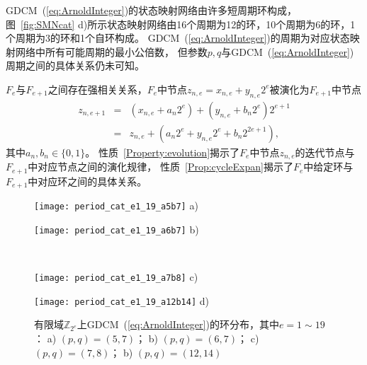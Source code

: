 GDCM~(\ref{eq:ArnoldInteger})的状态映射网络由许多短周期环构成，
图~\ref{fig:SMNcat} d)所示状态映射网络由16个周期为12的环，10个周期为6的环，1个周期为3的环和1个自环构成。
GDCM~(\ref{eq:ArnoldInteger})的周期为对应状态映射网络中所有可能周期的最小公倍数，
但参数$p,q$与GDCM~(\ref{eq:ArnoldInteger})周期之间的具体关系仍未可知。

$F_e$与$F_{e+1}$之间存在强相关关系，$F_e$中节点$z_{n, e}=x_{n, e}+y_{n, e}2^e$被演化为$F_{e+1}$中节点
\begin{eqnarray}
	z_{n, e+1} & = & (x_{n, e}+a_{n}2^e) + (y_{n, e}+b_{n}2^e) 2^{e+1} \nonumber\\
	           & = & z_{n, e}+(a_{n}2^e+y_{n, e}2^e+b_{n}2^{2e+1} ),
\label{eq:evoluteNumber}	
\end{eqnarray}
其中$a_{n}, b_{n}\in \{0, 1\}$。
性质~\ref{Property:evolution}揭示了$F_e$中节点$z_{n, e}$的迭代节点与$F_{e+1}$中对应节点之间的演化规律，
性质~\ref{Prop:cycleExpan}揭示了$F_e$中给定环与$F_{e+1}$中对应环之间的具体关系。

\begin{figure*}[!htb]
\centering
\begin{minipage}{0.95\BigOneImW}
\centering
\texttt{[image: period\_cat\_e1\_19\_a5b7]}
a)
\end{minipage} \hspace{1mm}
\begin{minipage}{0.95\BigOneImW}
\centering
\texttt{[image: period\_cat\_e1\_19\_a6b7]}
b)
\end{minipage}\\
\begin{minipage}{0.95\BigOneImW}
\centering
\texttt{[image: period\_cat\_e1\_19\_a7b8]}
c)
\end{minipage} \hspace{1mm}
\begin{minipage}{0.95\BigOneImW}
\centering
\texttt{[image: period\_cat\_e1\_19\_a12b14]}
d)
\end{minipage}
\caption{有限域$\mathbb{Z}_{2^e}$上GDCM~(\ref{eq:ArnoldInteger})的环分布，其中$e=1\sim 19$：
a) $(p, q)=(5, 7)$； b) $(p, q)=(6, 7)$； c) $(p, q)=(7, 8)$； b) $(p, q)=(12, 14)$}
\label{fig:perioddistributionab}
\end{figure*}

